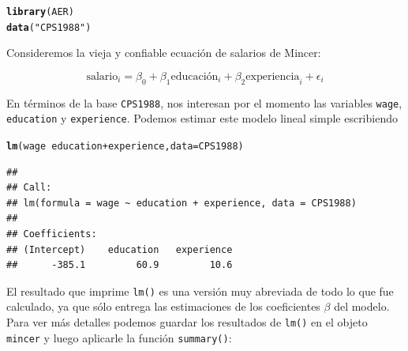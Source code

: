 \documentclass{article}\usepackage[]{graphicx}\usepackage[]{color}
\makeatletter
\newcommand{\hlstr}[1]{\textcolor[rgb]{0.192,0.494,0.8}{#1}}%
\newcommand{\hlopt}[1]{\textcolor[rgb]{0,0,0}{#1}}%
\newcommand{\hlstd}[1]{\textcolor[rgb]{0.345,0.345,0.345}{#1}}%
\newcommand{\hlkwc}[1]{\textcolor[rgb]{0.333,0.667,0.333}{#1}}%
\newcommand{\hlkwd}[1]{\textcolor[rgb]{0.737,0.353,0.396}{\textbf{#1}}}%
\newenvironment{kframe}{%
 \def\at@end@of@kframe{}%
 \ifinner\ifhmode%
  \def\at@end@of@kframe{\end{minipage}}%
  \begin{minipage}{\columnwidth}%
 \fi\fi%
 \def\FrameCommand##1{\hskip\@totalleftmargin \hskip-\fboxsep
 \colorbox{shadecolor}{##1}\hskip-\fboxsep
     \hskip-\linewidth \hskip-\@totalleftmargin \hskip\columnwidth}%
 \MakeFramed {\advance\hsize-\width
   \@totalleftmargin\z@ \linewidth\hsize
   \@setminipage}}%
 {\par\unskip\endMakeFramed%
 \at@end@of@kframe}
\newenvironment{knitrout}{}{} %
\newcommand*{\paq}[1]{\textbf{#1}}
\makeatother
\begin{document}
\hrulefill

\begin{knitrout}
\color{fgcolor}\begin{kframe}
\begin{alltt}
\hlkwd{library}\hlstd{(AER)}
\hlkwd{data}\hlstd{(}\hlstr{"CPS1988"}\hlstd{)}
\end{alltt}
\end{kframe}
\end{knitrout}

Consideremos la vieja y confiable ecuación de salarios de Mincer:

\begin{equation}
\text{salario}_i = \beta_0 + \beta_1 \text{educación}_i + \beta_2 \text{experiencia}_i + \epsilon_i
\label{eq:mincer}
\end{equation}

En términos de la base \verb|CPS1988|, nos interesan por el momento las variables \verb|wage|, \verb|education| y \verb|experience|. Podemos estimar este modelo lineal simple escribiendo

\begin{knitrout}
\color{fgcolor}\begin{kframe}
\begin{alltt}
\hlkwd{lm}\hlstd{(wage} \hlopt{~} \hlstd{education} \hlopt{+} \hlstd{experience,} \hlkwc{data} \hlstd{= CPS1988)}
\end{alltt}
\begin{verbatim}
## 
## Call:
## lm(formula = wage ~ education + experience, data = CPS1988)
## 
## Coefficients:
## (Intercept)    education   experience  
##      -385.1         60.9         10.6
\end{verbatim}
\end{kframe}
\end{knitrout}

El resultado que imprime \verb|lm()| es una versión muy abreviada de todo lo que fue calculado, ya que sólo entrega las estimaciones de los coeficientes $\beta$ del modelo. Para ver más detalles podemos guardar los resultados de \verb|lm()| en el objeto \verb|mincer| y luego aplicarle la función \verb|summary()|:
\end{document}
